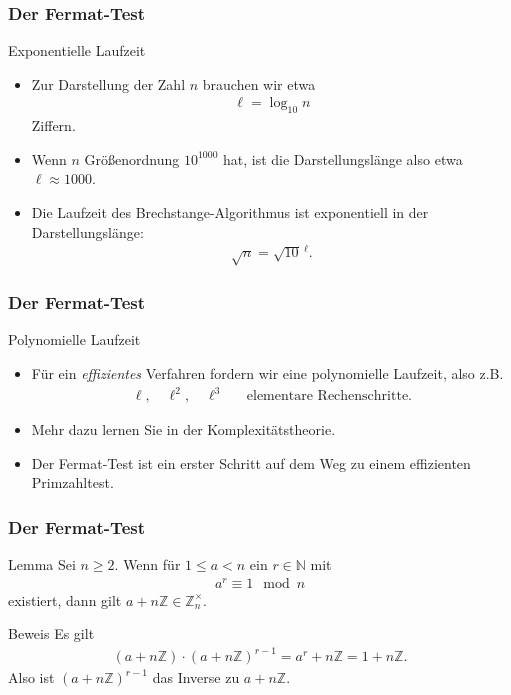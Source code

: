 \documentclass{beamer}
\renewcommand{\emph}[1]{{\textcolor{solarizedRed}{\itshape #1}}}
\newcommand\NN{\mathbb N}
\newcommand\ZZ{\mathbb Z}
\renewcommand{\ae}{\"a}
\renewcommand{\oe}{\"o}
\newcommand{\ue}{\"u}
\begin{document}
\begin{frame}\frametitle{Der Fermat-Test}
	\begin{block}{Exponentielle Laufzeit}
		\begin{itemize}
			\item Zur Darstellung der Zahl $n$ brauchen wir etwa
				\begin{align*}
					\ell=\log_{10}n
				\end{align*}
				Ziffern.
			\item Wenn $n$ Gr\oe\ss enordnung $10^{1000}$ hat, ist die Darstellungsl\ae nge also etwa $\ell\approx1000$.
			\item Die Laufzeit des Brechstange-Algorithmus ist \alert{exponentiell} in der Darstellungsl\ae nge:
				\begin{align*}
					\sqrt n=\sqrt{10}\,^{\ell}.
				\end{align*}
		\end{itemize}
	\end{block}
\end{frame}

\begin{frame}\frametitle{Der Fermat-Test}
	\begin{block}{Polynomielle Laufzeit}
		\begin{itemize}
			\item F\ue r ein \emph{effizientes} Verfahren fordern wir eine polynomielle Laufzeit, also z.B.
				\begin{align*}
					\ell,\quad\ell^2,\quad\ell^3&&\mbox{elementare Rechenschritte.}
				\end{align*}
			\item Mehr dazu lernen Sie in der \alert{Komplexit\ae tstheorie}.
			\item Der Fermat-Test ist ein erster Schritt auf dem Weg zu einem effizienten Primzahltest.
		\end{itemize}
	\end{block}
\end{frame}

\begin{frame}\frametitle{Der Fermat-Test}
	\begin{block}{Lemma}
		Sei $n\geq2$.
		Wenn f\ue r $1\leq a<n$ ein $r\in\NN$ mit 
		\begin{align*}
			a^r\equiv1\mod n
		\end{align*}
		existiert, dann gilt $a+n\ZZ\in\ZZ_n^\times$.
	\end{block}
	\begin{block}{Beweis}
		Es gilt
		\begin{align*}
			(a+n\ZZ)\cdot(a+n\ZZ)^{r-1}=a^r+n\ZZ=1+n\ZZ.
		\end{align*}
		Also ist $(a+n\ZZ)^{r-1}$ das Inverse zu $a+n\ZZ$.
	\end{block}
\end{frame}
\end{document}
